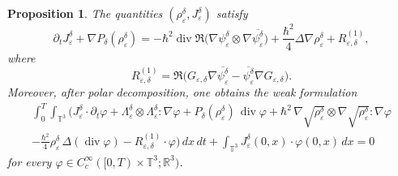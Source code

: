 \documentclass[11pt]{article}
\newtheorem{proposition}{Proposition}
\begin{document}
\begin{proposition}\label{prop:momentum-eps-delta}
The quantities $(\rho^\delta_\varepsilon,J^\delta_\varepsilon)$ satisfy
\begin{equation}\label{eq:mom-stress-eps-delta}
\partial_t J^\delta_\varepsilon+\nabla P_\delta(\rho^\delta_\varepsilon)
=
-\hbar^2\operatorname{div}\Re\!\bigl(\nabla\psi^\delta_\varepsilon\otimes\nabla\overline{\psi^\delta_\varepsilon}\bigr)
+\frac{\hbar^2}{4}\Delta\nabla\rho^\delta_\varepsilon
+R^{(1)}_{\varepsilon,\delta},
\end{equation}
where
\[
R^{(1)}_{\varepsilon,\delta}
=
\Re\!\bigl(G_{\varepsilon,\delta}\nabla\overline{\psi^\delta_\varepsilon}
-
\overline{\psi^\delta_\varepsilon}\nabla G_{\varepsilon,\delta}\bigr).
\]
Moreover, after polar decomposition, one obtains the weak formulation
\begin{equation}\label{eq:weak-qhd-momentum-eps-delta}
\begin{aligned}
\int_0^T\!\!\int_{\mathbb{T}^3}
\Big(
J^\delta_\varepsilon\cdot \partial_t\varphi
+
\Lambda^\delta_\varepsilon\otimes\Lambda^\delta_\varepsilon : \nabla\varphi
+
P_\delta(\rho^\delta_\varepsilon)\,\operatorname{div}\varphi
+
\hbar^2\,\nabla\sqrt{\rho^\delta_\varepsilon}\otimes\nabla\sqrt{\rho^\delta_\varepsilon}:\nabla\varphi
\\
-
\frac{\hbar^2}{4}\rho^\delta_\varepsilon\,\Delta(\operatorname{div}\varphi)
-
R^{(1)}_{\varepsilon,\delta}\cdot\varphi
\Big)\,dx\,dt
+
\int_{\mathbb{T}^3}
J^\delta_\varepsilon(0,x)\cdot\varphi(0,x)\,dx
=0
\end{aligned}
\end{equation}
for every $\varphi\in C_c^\infty([0,T)\times\mathbb{T}^3;\mathbb{R}^3)$.
\end{proposition}
\end{document}
